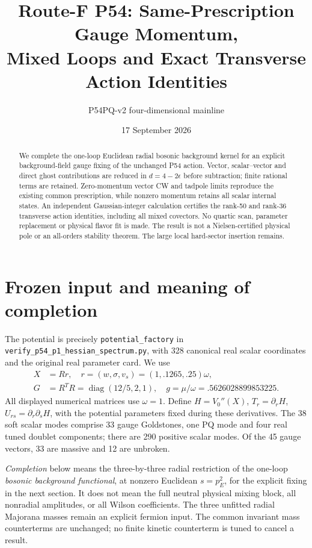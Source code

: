 \documentclass[11pt]{article}
\title{Route-F P54: Same-Prescription Gauge Momentum,\\
Mixed Loops and Exact Transverse Action Identities}
\author{P54PQ-v2 four-dimensional mainline}
\date{17 September 2026}
\newcommand{\diag}{\operatorname{diag}}
\begin{document}
\maketitle
\begin{abstract}
We complete the one-loop Euclidean radial bosonic background kernel for
an explicit background-field gauge fixing of the unchanged P54 action.
Vector, scalar--vector and direct ghost contributions are reduced in
$d=4-2\epsilon$ before subtraction; finite rational terms are retained.
Zero-momentum vector CW and tadpole limits reproduce the existing common
prescription, while nonzero momentum retains all scalar internal states.
An independent Gaussian-integer calculation certifies the rank-50 and
rank-36 transverse action identities, including all mixed covectors.
No quartic scan, parameter replacement or physical flavor fit is made.
The result is not a Nielsen-certified physical pole or an all-orders
stability theorem. The large local hard-sector insertion remains.
\end{abstract}

\section{Frozen input and meaning of completion}
The potential is precisely \texttt{potential\_factory} in
\texttt{verify\_p54\_p1\_hessian\_spectrum.py}, with 328 canonical real
scalar coordinates and the original real parameter card. We use
\begin{align}
 X&=Rr,\quad r=(w,\sigma,v_s)=(1,.1265,.25)\omega,\\
 G&=R^TR=\diag(12/5,2,1),\quad
 g=\mu/\omega=.5626028899853225.
\end{align}
All displayed numerical matrices use $\omega=1$. Define
$H=V_0''(X)$, $T_r=\partial_r H$, $U_{rs}=\partial_r\partial_s H$,
with the potential parameters fixed during these derivatives.
The 38 soft scalar modes comprise 33 gauge Goldstones, one PQ mode and
four real tuned doublet components; there are 290 positive scalar modes.
Of the 45 gauge vectors, 33 are massive and 12 are unbroken.

\emph{Completion} below means the three-by-three radial restriction of the
one-loop \emph{bosonic background functional}, at nonzero Euclidean
$s=p_E^2$, for the explicit fixing in the next section. It does not mean
the full neutral physical mixing block, all nonradial amplitudes, or
all Wilson coefficients. The three unfitted radial Majorana masses
remain an explicit fermion input. The common invariant mass counterterms
are unchanged; no finite kinetic counterterm is tuned to cancel a result.
\end{document}
